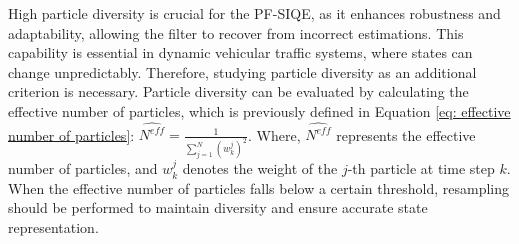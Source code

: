 High particle diversity is crucial for the PF-SIQE, as it enhances robustness and adaptability, allowing the filter to recover from incorrect estimations. This capability is essential in dynamic vehicular traffic systems, where states can change unpredictably. Therefore, studying particle diversity as an additional criterion is necessary. Particle diversity can be evaluated by calculating the effective number of particles, which is previously defined in Equation \ref{eq: effective number of particles}: $\widehat{N^{eff}} = \frac{1}{\sum_{j=1}^N ({w}_k^{j})^2}$. Where, \(\widehat{N^{eff}}\) represents the effective number of particles, and \({w}_k^{j}\) denotes the weight of the \(j\)-th particle at time step \(k\). When the effective number of particles falls below a certain threshold, resampling should be performed to maintain diversity and ensure accurate state representation.

